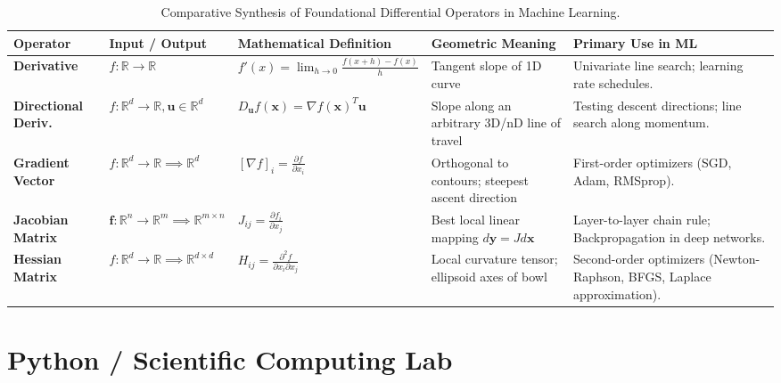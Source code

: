 \begin{table}[htbp]
\centering
\footnotesize
\setlength{\tabcolsep}{3pt}
\begin{tabularx}{\textwidth}{lp{2.3cm}p{2.9cm}XX}
\toprule
\textbf{Operator} & \textbf{Input / Output} & \textbf{Mathematical Definition} & \textbf{Geometric Meaning} & \textbf{Primary Use in ML} \\
\midrule
\textbf{Derivative} & $f: \mathbb{R} \to \mathbb{R}$ & $f'(x) = \lim_{h\to 0}\frac{f(x+h)-f(x)}{h}$ & Tangent slope of 1D curve & Univariate line search; learning rate schedules. \\
\addlinespace
\textbf{Directional Deriv.} & $f: \mathbb{R}^d \to \mathbb{R}, \mathbf{u} \in \mathbb{R}^d$ & $D_{\mathbf{u}} f(\mathbf{x}) = \nabla f(\mathbf{x})^T \mathbf{u}$ & Slope along an arbitrary 3D/nD line of travel & Testing descent directions; line search along momentum. \\
\addlinespace
\textbf{Gradient Vector} & $f: \mathbb{R}^d \to \mathbb{R} \implies \mathbb{R}^d$ & $[\nabla f]_i = \frac{\partial f}{\partial x_i}$ & Orthogonal to contours; steepest ascent direction & First-order optimizers (SGD, Adam, RMSprop). \\
\addlinespace
\textbf{Jacobian Matrix} & $\mathbf{f}: \mathbb{R}^n \to \mathbb{R}^m \implies \mathbb{R}^{m \times n}$ & $J_{ij} = \frac{\partial f_i}{\partial x_j}$ & Best local linear mapping $d\mathbf{y} = J d\mathbf{x}$ & Layer-to-layer chain rule; Backpropagation in deep networks. \\
\addlinespace
\textbf{Hessian Matrix} & $f: \mathbb{R}^d \to \mathbb{R} \implies \mathbb{R}^{d \times d}$ & $H_{ij} = \frac{\partial^2 f}{\partial x_i \partial x_j}$ & Local curvature tensor; ellipsoid axes of bowl & Second-order optimizers (Newton-Raphson, BFGS, Laplace approximation). \\
\bottomrule
\end{tabularx}
\caption{Comparative Synthesis of Foundational Differential Operators in Machine Learning.}
\label{tab:calculus_operators}
\end{table}

\section{Python / Scientific Computing Lab}

